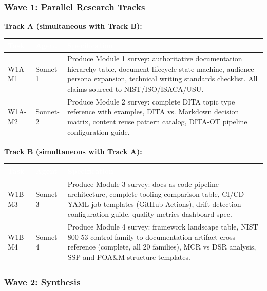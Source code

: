 \documentclass[11pt,letterpaper]{article}
\newcommand{\tableheader}[1]{\textbf{\sffamily\textcolor{white}{#1}}}
\begin{document}
\subsubsection{Wave 1: Parallel Research Tracks}

\textbf{Track A (simultaneous with Track B):}

\begin{center}
\begin{tabularx}{\textwidth}{L{3cm}L{2.5cm}X}
\toprule
{}
\tableheader{Task} & \tableheader{Agent} & \tableheader{Specification} \\
\midrule
W1A-M1 & Sonnet-1 & Produce Module 1 survey: authoritative documentation hierarchy table, document lifecycle state machine, audience persona expansion, technical writing standards checklist. All claims sourced to NIST/ISO/ISACA/USU. \\
W1A-M2 & Sonnet-2 & Produce Module 2 survey: complete DITA topic type reference with examples, DITA vs. Markdown decision matrix, content reuse pattern catalog, DITA-OT pipeline configuration guide. \\
\bottomrule
\end{tabularx}
\end{center}

\textbf{Track B (simultaneous with Track A):}

\begin{center}
\begin{tabularx}{\textwidth}{L{3cm}L{2.5cm}X}
\toprule
{}
\tableheader{Task} & \tableheader{Agent} & \tableheader{Specification} \\
\midrule
W1B-M3 & Sonnet-3 & Produce Module 3 survey: docs-as-code pipeline architecture, complete tooling comparison table, CI/CD YAML job templates (GitHub Actions), drift detection configuration guide, quality metrics dashboard spec. \\
W1B-M4 & Sonnet-4 & Produce Module 4 survey: framework landscape table, NIST 800-53 control family to documentation artifact cross-reference (complete, all 20 families), MCR vs DSR analysis, SSP and POA\&M structure templates. \\
\bottomrule
\end{tabularx}
\end{center}

\subsubsection{Wave 2: Synthesis}
\end{document}

